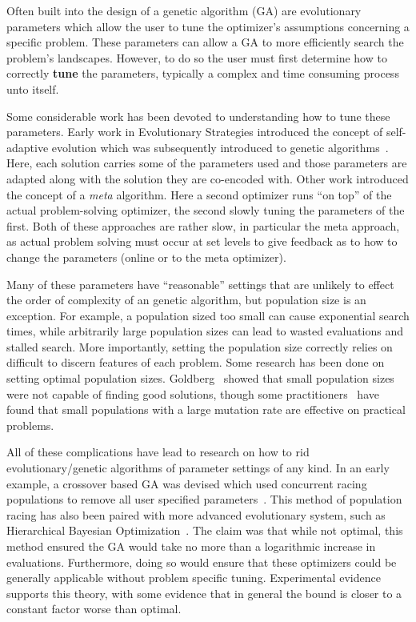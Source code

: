 \documentclass{sig-alternate}
\begin{document}
Often built into the design of a genetic algorithm (GA) are
evolutionary parameters which allow the user to tune the optimizer's
assumptions concerning a specific problem.  These parameters can allow
a GA to more efficiently search the problem's landscapes.  However, to
do so the user must first determine how to correctly \textbf{tune} the
parameters, typically a complex and time consuming process unto
itself.

Some considerable work has been devoted to understanding how to tune
these parameters. Early work in Evolutionary Strategies introduced the
concept of self-adaptive evolution which was subsequently introduced
to genetic algorithms~\cite{Back:1992:selfadapt}. Here, each solution
carries some of the parameters used and those parameters are adapted
along with the solution they are co-encoded with. Other work introduced the concept
of a \emph{meta} algorithm\cite{grefenstette:1986:optimalga}. Here a
second optimizer runs ``on top'' of the actual problem-solving
optimizer, the second slowly tuning the parameters of the first. Both
of these approaches are rather slow, in particular the meta
approach, as actual problem solving must occur at set levels to give
feedback as to how to change the parameters (online or to the meta
optimizer). 

Many of these parameters have ``reasonable'' settings that are
unlikely to effect the order of complexity of an genetic algorithm,
but population size is an exception. For example, a population sized
too small can cause exponential search times, while arbitrarily large
population sizes can lead to wasted evaluations and stalled search.
More importantly, setting the population size correctly relies on
difficult to discern features of each problem. Some research has been
done on setting optimal population
sizes. Goldberg~\cite{goldberg:1991:gasize} showed that small
population sizes were not capable of finding good solutions, though
some practitioners~\cite{haupt:2000:optimum} have found that small
populations with a large mutation rate are effective on practical
problems.

All of these complications have lead to research on how to rid
evolutionary/genetic algorithms of parameter settings of any kind.  In
an early example, a crossover based GA was devised which used
concurrent racing populations to remove all user specified
parameters~\cite{harik:1999:parameterlessga}.  This method of
population racing has also been paired with more advanced evolutionary
system, such as Hierarchical Bayesian
Optimization~\cite{pelikan:2004:parameterlesshboa}. The claim was that
while not optimal, this method ensured the GA would take no more than
a logarithmic increase in evaluations.  Furthermore, doing so would
ensure that these optimizers could be generally applicable without
problem specific tuning.  Experimental evidence supports this theory,
with some evidence that in general the bound is closer to a constant
factor worse than optimal.
\end{document}
